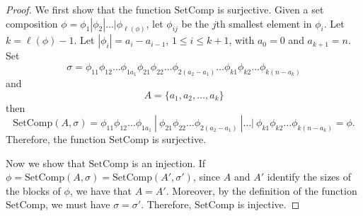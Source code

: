 \documentclass[11pt]{amsart}
\newtheorem{Proposition}[Theorem]{Proposition}
\numberwithin{equation}{section}
\newcommand{\SetComp}{\mathrm{SetComp}}
\newcommand{\FA}[1]{\textcolor{red}{#1}}
\begin{document}
%
%	

\begin{proof} We first show that the function $\SetComp$ is surjective. Given a set composition $\phi=\phi_1|\phi_2|\dots|\phi_{\ell(\phi)}$, let $\phi_{ij}$ be the $j$th smallest element in $\phi_i$. Let $k=\ell(\phi)-1$. Let $|\phi_i|=a_i-a_{i-1}$, $1\leq i\leq k+1$, with $a_0=0$ and $a_{k+1}=n$.
Set $$\sigma=\phi_{11}\phi_{12}\dots\phi_{1a_1} \phi_{21}\phi_{22}\dots\phi_{2(a_2-a_1)} \dots \phi_{k1}\phi_{k2}\dots\phi_{k(n-a_k)}$$
and 
$$A=\{a_1,a_2,\dots, a_k\}$$ then 
$$\SetComp(A,\sigma)=\phi_{11}\phi_{12}\dots\phi_{1a_1}~|~ \phi_{21}\phi_{22}\dots\phi_{2(a_2-a_1)}~| \dots|~ \phi_{k1}\phi_{k2}\dots\phi_{k(n-a_k)}=\phi.$$
Therefore, the function $\SetComp$ is surjective.

Now we show that $\SetComp$ is an injection. If $\phi=\SetComp(A,\sigma)=\SetComp(A',\sigma')$, since $A$ and $A'$ identify the sizes of the blocks of $\phi$, we have that $A=A'$. Moreover, by the definition of the function $\SetComp$, we must have $\sigma=\sigma'$. Therefore, $\SetComp$ is injective.  

\end{proof}
\end{document}
